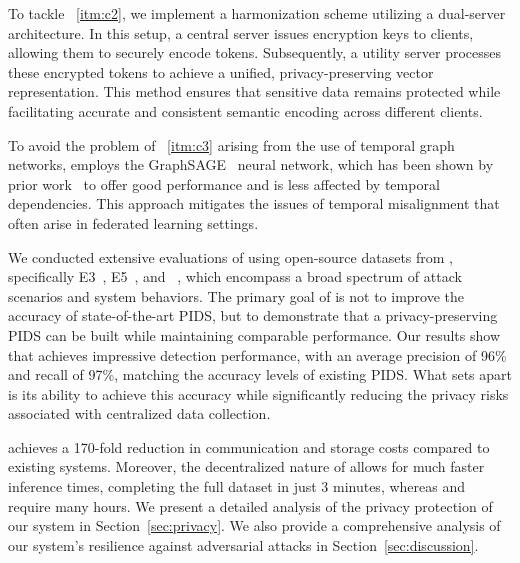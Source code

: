 To tackle ~\ref{itm:c2}, we implement a \wordvec harmonization scheme utilizing a dual-server architecture. In this setup, a central server issues encryption keys to clients, allowing them to securely encode \wordvec tokens. Subsequently, a utility server processes these encrypted tokens to achieve a unified, privacy-preserving vector representation. This method ensures that sensitive data remains protected while facilitating accurate and consistent semantic encoding across different clients.

To avoid the problem of ~\ref{itm:c3} arising from the use of temporal graph networks, \Sys employs the GraphSAGE~\cite{hamilton2017inductive} neural network, which has been shown by prior work~\cite{flash2024,shadewatcher,wang2022threatrace} to offer good performance and is less affected by temporal dependencies. This approach mitigates the issues of temporal misalignment that often arise in federated learning settings.

We conducted extensive evaluations of \Sys using open-source datasets from \darpa, specifically E3~\cite{error3}, E5~\cite{bug5}, and \optc~\cite{anjum2021analyzing}, which encompass a broad spectrum of attack scenarios and system behaviors. The primary goal of \Sys is not to improve the accuracy of state-of-the-art PIDS, but to demonstrate that a privacy-preserving PIDS can be built while maintaining comparable performance. Our results show that \Sys achieves impressive detection performance, with an average precision of 96\% and recall of 97\%, matching the accuracy levels of existing PIDS. What sets \Sys apart is its ability to achieve this accuracy while significantly reducing the privacy risks associated with centralized data collection.

\Sys achieves a 170-fold reduction in communication and storage costs compared to existing systems. Moreover, the decentralized nature of \Sys allows for much faster inference times, completing the full \optc dataset in just 3 minutes, whereas \flash and \kairos require many hours. We present a detailed analysis of the privacy protection of our system in Section~\ref{sec:privacy}. We also provide a comprehensive analysis of our system's resilience against adversarial attacks in Section~\ref{sec:discussion}. 


